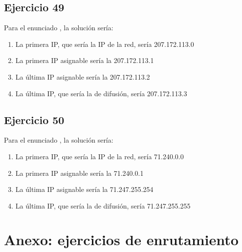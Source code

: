 \documentclass[letterpaper,10pt,spanish]{sphinxmanual}
\begin{document}
\section{Ejercicio 49}
\label{\detokenize{t2_integracion_elementos/ejercicios_subredes_ipv4/rangos_direcciones:id49}}
\sphinxAtStartPar
Para el enunciado , la solución sería:
\begin{enumerate}
%
\item {} 
\sphinxAtStartPar
La primera IP, que sería la IP de la red, sería 207.172.113.0

\item {} 
\sphinxAtStartPar
La primera IP asignable sería la 207.172.113.1

\item {} 
\sphinxAtStartPar
La última IP asignable sería la 207.172.113.2

\item {} 
\sphinxAtStartPar
La última IP, que sería la de difusión, sería 207.172.113.3

\end{enumerate}


\section{Ejercicio 50}
\label{\detokenize{t2_integracion_elementos/ejercicios_subredes_ipv4/rangos_direcciones:id50}}
\sphinxAtStartPar
Para el enunciado , la solución sería:
\begin{enumerate}
%
\item {} 
\sphinxAtStartPar
La primera IP, que sería la IP de la red, sería 71.240.0.0

\item {} 
\sphinxAtStartPar
La primera IP asignable sería la 71.240.0.1

\item {} 
\sphinxAtStartPar
La última IP asignable sería la 71.247.255.254

\item {} 
\sphinxAtStartPar
La última IP, que sería la de difusión, sería 71.247.255.255

\end{enumerate}


\chapter{Anexo: ejercicios de enrutamiento}
\label{\detokenize{t2_integracion_elementos/ejercicios_subredes_ipv4/ejercicios_dos_router:anexo-ejercicios-de-enrutamiento}}\label{\detokenize{t2_integracion_elementos/ejercicios_subredes_ipv4/ejercicios_dos_router::doc}}
\end{document}
